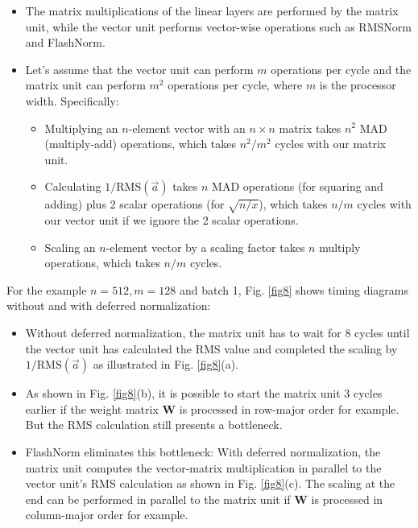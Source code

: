 \documentclass{article}
\numberwithin{equation}{section} %
\newcommand{\mat}[1]{\mathbf{#1}}     %
\def\rms{\text{RMS}(\vec{a})}         %
\begin{document}
\begin{itemize}[topsep=-1pt, itemsep=-1pt]
  \item The matrix multiplications of the linear layers are performed by the matrix unit, while the vector unit performs vector-wise operations such as RMSNorm and FlashNorm.
  \item Let’s assume that the vector unit can perform $m$ operations per cycle and the matrix unit can perform $m^2$ operations per cycle, where $m$ is the processor width. Specifically:
  \begin{itemize}[topsep=-1pt, itemsep=-1pt]
    \item Multiplying an $n$-element vector with an $n \times n$ matrix takes $n^2$ MAD (multiply-add) operations, which takes $n^2/m^2$ cycles with our matrix unit.
    \item Calculating $1/\rms$ takes $n$ MAD operations (for squaring and adding) plus 2 scalar operations (for $\sqrt{n/x}$), which takes $n/m$ cycles with our vector unit if we ignore the 2 scalar operations.
    \item Scaling an $n$-element vector by a scaling factor takes $n$ multiply operations, which takes $n/m$ cycles.
  \end{itemize}
\end{itemize}

For the example $n = 512, m = 128$ and batch 1, Fig. \ref{fig8} shows timing diagrams without and with deferred normalization:
\begin{itemize}[topsep=-1pt, itemsep=-1pt]
  \item Without deferred normalization, the matrix unit has to wait for 8 cycles until the vector unit has calculated the RMS value and completed the scaling by $1/ \rms$ as illustrated in Fig. \ref{fig8}(a).
  \item As shown in Fig. \ref{fig8}(b), it is possible to start the matrix unit 3 cycles earlier if the weight matrix $\mat{W}$ is processed in row-major order for example. But the RMS calculation still presents a bottleneck.
  \item FlashNorm eliminates this bottleneck: With deferred normalization, the matrix unit computes the vector-matrix multiplication in parallel to the vector unit's RMS calculation as shown in Fig. \ref{fig8}(c). The scaling at the end can be performed in parallel to the matrix unit if $\mat{W}$ is processed in column-major order for example.
\end{itemize}
\end{document}
